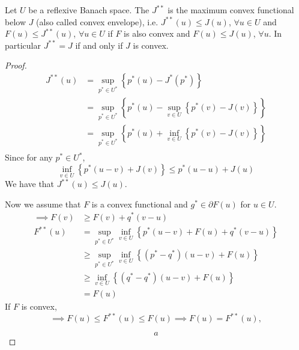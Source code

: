 \begin{theorem}
	Let $U$ be a reflexive Banach space. The $J^{**}$ is the maximum convex functional below $J$ (also called convex envelope), i.e. $J^{**}(u)\leq J(u)$, $\forall u \in U$ and $F(u)\leq J^{**}(u)$, $\forall u \in U$ if $F$ is also convex and $F(u)\leq J(u)$, $\forall u$. In particular $J^{**}=J$ if and only if $J$ is convex.
	\begin{proof}
		\begin{align}
			J^{**}(u)&=\sup_{p^*\in U^*} \left\lbrace p^*(u)-J^*(p^*) \right\rbrace\\
					&=\sup_{p^*\in U^*} \left\lbrace p^*(u)-\sup_{v\in U}\left\lbrace p^*(v)-J(v)\right\rbrace\right\rbrace\\
					&=\sup_{p^*\in U^*} \left\lbrace p^*(u)+\inf_{v\in U}\left\lbrace p^*(v)-J(v)\right\rbrace\right\rbrace\\
		\end{align}
		Since for any $p^* \in U^*$,
			\[
				\inf_{v\in U}\left\lbrace p^* \left(u-v\right)+J(v) \right\rbrace \leq p^*(u-u)+J(u)
			\]
		We have that $J^{**}(u)\leq J(u)$.
		
		Now we assume that $F$ is a convex functional and $g^* \in \partial F(u)$ for $u \in U$.
		\begin{align}
			\implies  F(v)&\geq F(v)+q^*(v-u)\\
					  F^{**}(u)& = \sup_{p^* \in U^*} \inf_{v \in U} \left\lbrace p^*(u-v)+F(u)+q^*(v-u)\right\rbrace \\
					  &\geq \sup_{p^* \in U^*} \inf_{v \in U} \left\lbrace \left(p^*-q^*\right)(u-v)+F(u)\right\rbrace\\
					  &\geq \inf_{v \in U} \left\lbrace (q^*-q^*)(u-v)+F(u) \right\rbrace\\
					  &=F(u)
		\end{align}
	If $F$ is convex,
	\begin{equation}
		\implies F(u)\leq F^{**}(u)\leq F(u) \implies F(u)=F^{**}(u),
	\end{equation}

	\begin{equation}
a		
	\end{equation}
	\end{proof}
\end{theorem}